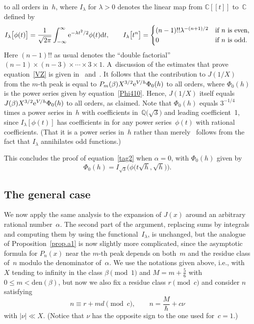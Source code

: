 \documentclass[pdftex]{sigma}
\numberwithin{equation}{section}
\def\l{\lambda}
\def\a{\alpha}
\def\l{\lambda}
\def\C{\mathbb C}
\def\Q{\mathbb Q}
\def\hb{\hbar}
\def\a{\alpha}
\def\b{\beta}
\def\l{\lambda}
\def\den{\mathrm{den}}
\def\J{\mathbf J} \def\J{J} %
\def\be{\begin{equation}}
\def\ee{\end{equation}}
\begin{document}
to all orders in~$h$, where $I_\l$ for $\l>0$ denotes the linear map
from $\C[[t]]$ to~$\C$ defined by
\[
I_\l\bigl[\phi(t)\bigr] = \frac1{\sqrt{2\pi}} \int_{-\infty}^\infty
{\rm e}^{-\l t^2/2}\phi(t) {\rm d}t ,
\qquad I_\l\bigl[t^n\bigr] =
\begin{cases}
(n-1)!! \lambda^{-(n+1)/2} &\text{if $n$ is even,}\\ 0
&\text{if $n$ is odd.}
\end{cases}
\]
Here $(n-1)!!$ as usual denotes the ``double factorial''
$(n-1)\times(n-3)\times\cdots\times3\times1$. A~discussion of the estimates that prove
equation~\eqref{VZ} is given in~\cite{VZ,Zagier} and~\cite{GZ:asymptotics}. It
follows that the contribution to $\J(1/X)$ from the $m$-th peak is equal to
$P_m(\b)X^{3/2}{\rm e}^{V/h}\Phi_0(h)$ to all orders, where $\Phi_0(h)$ is the power series
given by equation~\eqref{Phi410}. Hence, $\J(1/X)$ itself equals
$\J(\b)X^{3/2}{\rm e}^{V/h}\Phi_0(h)$ to all orders, as claimed. Note that $\Phi_0(h)$ equals
$3^{-1/4}$ times a power series in~$h$ with coefficients in~$\Q\big(\sqrt3\big)$ and leading
coefficient~1, since $I_\l[\phi(t)]$ has coefficients in \smash{$\l^{-1/2}\Q(\l)$} for any power
series~$\phi(t)$ with rational coefficients. (That it is a power series in~$h$ rather
than merely~ follows from the fact that $I_\l$ annihilates odd functions.)

This concludes the proof of equation~\eqref{tag2} when $\a=0$, with $\Phi_0(h)$ given by
\be
\label{Phi410}
\Phi_0(h) = I_{\sqrt{3}}\big(\phi\big(t\sqrt{h},\sqrt{h}\big)\big) .
\ee

\subsection{The general case}
\label{sub.proof41}

We now apply the same analysis to the expansion of $\J(x)$ around an
arbitrary rational number~$\a$. The second part of the argument, replacing
sums by integrals and computing them by using the functional~$I_\l$, is
unchanged, but the analogue of Proposition~\ref{prop.a1} is now slightly more
complicated, since the asymptotic formula for $P_n(x)$ near
the $m$-th peak depends on both~$m$ and the residue class of~$n$ modulo the
denominator of~$\a$. We use the notations given above, i.e.,
 with~$X$ tending to infinity in the class
$\b\!\pmod1$ and $M=m+\frac56$
with $0\le m<\den(\b)$, but now we also fix a residue class $r\!\pmod c$ and
consider $n$ satisfying
\[%
n \equiv r+m d\pmod c , \qquad n = \frac M\hb+c \nu
\]
with $|\nu|\ll X$. (Notice that $\nu$ has the opposite sign to the one
used for~$c=1$.)
\end{document}
